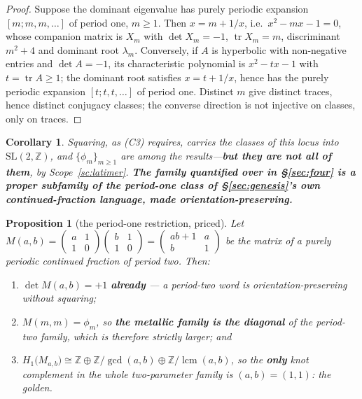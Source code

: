 \documentclass[11pt,reqno]{amsart}
\theoremstyle{plain}
\newtheorem{proposition}[theorem]{Proposition}
\newtheorem{corollary}[theorem]{Corollary}
\theoremstyle{definition}
\theoremstyle{remark}
\newcommand{\Z}{\mathbb{Z}}
\newcommand{\SL}{\mathrm{SL}}
\newcommand{\tr}{\operatorname{tr}}
\begin{document}
\begin{proof}
Suppose the dominant eigenvalue has purely periodic expansion $[m;m,m,\dots]$ of period
one, $m\ge1$. Then $x=m+1/x$, i.e.\ $x^2-mx-1=0$, whose companion matrix is $X_m$ with
$\det X_m=-1$, $\tr X_m=m$, discriminant $m^2+4$ and dominant root $\lambda_m$.
Conversely, if $A$ is hyperbolic with non-negative entries and $\det A=-1$, its
characteristic polynomial is $x^2-tx-1$ with $t=\tr A\ge1$; the dominant root satisfies
$x=t+1/x$, hence has the purely periodic expansion $[t;t,t,\dots]$ of period one.
Distinct $m$ give distinct traces, hence distinct conjugacy classes; the converse
direction is not injective on classes, only on traces.
\end{proof}

\begin{corollary}\label{cor:c3family}
Squaring, as (C3) requires, carries the classes of this locus into $\SL(2,\Z)$, and
$\{\phi_m\}_{m\ge1}$ are among the results---\textbf{but they are not all of them}, by
Scope~\ref{sc:latimer}. \textbf{The family quantified over in \S\ref{sec:four} is a proper subfamily of the period-one
class of \S\ref{sec:genesis}'s own continued-fraction language, made
orientation-preserving.}
\end{corollary}

\begin{proposition}[the period-one restriction, priced]\label{prop:periodtwo}
Let $M(a,b)=\left(\begin{smallmatrix}a&1\\1&0\end{smallmatrix}\right)
\left(\begin{smallmatrix}b&1\\1&0\end{smallmatrix}\right)
=\left(\begin{smallmatrix}ab+1&a\\b&1\end{smallmatrix}\right)$ be the matrix of a purely
periodic continued fraction of period two. Then:
\begin{enumerate}[label=\textup{(\roman*)},leftmargin=2.4em]
\item $\det M(a,b)=+1$ \textbf{already} --- a period-two word is orientation-preserving
  without squaring;
\item $M(m,m)=\phi_m$, so \textbf{the metallic family is the diagonal} of the period-two
  family, which is therefore strictly larger; and
\item $H_1\bigl(M_{a,b}\bigr)\cong\Z\oplus\Z/\gcd(a,b)\oplus\Z/\operatorname{lcm}(a,b)$,
  so the \textbf{only} knot complement in the whole two-parameter family is
  $(a,b)=(1,1)$: the golden.
\end{enumerate}
\end{proposition}
\end{document}

